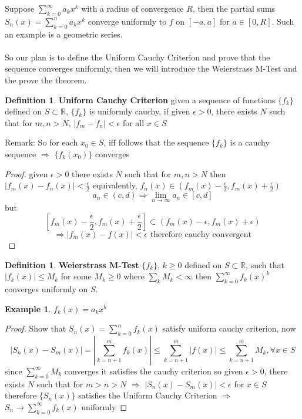 \documentclass[12pt]{article}
\theoremstyle{plain}
\theoremstyle{definition}
\newtheorem{definition}[theorem]{Definition}
\newtheorem{example}[theorem]{Example}
\begin{document}
Suppose $\sum^\infty_{k=0} a_k x^k$ with a radius of convergence $R$, then the partial sums $S_n (x) = \sum^n_{k=0} a_k x^k$ converge uniformly to $f$ on $[-a,a]$ for $a \in [0,R]$. Such an example is a geometric series.\\
\\
So our plan is to define the Uniform Cauchy Criterion and prove that the sequence converges uniformly, then we will introduce the Weierstrass M-Test and the prove the theorem.

\begin{definition}
	\textbf{Uniform Cauchy Criterion} given a sequence of functions $\{ f_k \}$ defined on $S \subset \mathbb{R}$, $\{ f_k \}$ is uniformly cauchy, if given $\epsilon > 0$, there exists $N$ such that for $m,n > N$, $|f_m - f_n| < \epsilon$ for all $x \in S$
\end{definition}

Remark: So for each $x_0 \in S$, iff follows that the sequence $\{ f_k \}$ is a cauchy sequence $\Longrightarrow$ $\{ f_k (x_0)\}$ converges

\begin{proof}
	given $\epsilon > 0$ there exists $N$ such that for $m,n > N$ then 
	$|f_m (x) - f_n (x) | < \frac{\epsilon}{2}$
	equivalently, $f_n (x) \in (f_m (x) - \frac{\epsilon}{2}, f_m (x) + \frac{\epsilon}{2}) $
	$$a_n \in (c,d) \Longrightarrow \lim_{n\to\infty} a_n \in [c,d]$$
	but $$[f_m (x) - \frac{\epsilon}{2}, f_m (x) + \frac{\epsilon}{2}] \subset (f_m (x) - \epsilon, f_m (x) + \epsilon)$$
	$$\Longrightarrow |f_m (x) - f(x)| < \epsilon \text{ therefore cauchy convergent}$$
\end{proof}

\begin{definition}
	\textbf{Weierstrass M-Test} $\{ f_k \}$, $k \geq 0$ defined on $S \subset \mathbb{R}$, such that $|f_k (x)| \leq M_k$ for some $M_k \geq 0$ where $\sum_k M_k < \infty$ then $\sum^\infty_{k=0} f_k (x)^k$ converges uniformly on $S$.
\end{definition}

\begin{example}
	$f_k (x) = a_k x^k$
\end{example}

\begin{proof}
	Show that $S_n (x) = \sum^n_{k=0} f_k (x)$ satisfy uniform cauchy criterion, now 
	$$|S_n (x) - S_m (x)| = |\sum^m_{k=n+1} f_k (x)| \leq  \sum^m_{k=n+1} |f (x)| \leq \sum^m_{k=n+1} M_k, \forall x \in S$$
	since $\sum^\infty_{k=0} M_k$ converges it satisfies the cauchy criterion so given $\epsilon > 0$, there exists $N$ such that for $m>n>N$ $\Longrightarrow$ $|S_n (x) - S_m (x)| < \epsilon$ for $x\in S$ therefore $\{ S_n (x) \}$ satisfies the Uniform Cauchy Criterion $\Longrightarrow$ $S_n \to \sum^\infty_{k=0} f_k (x)$ uniformly
\end{proof}
\end{document}
